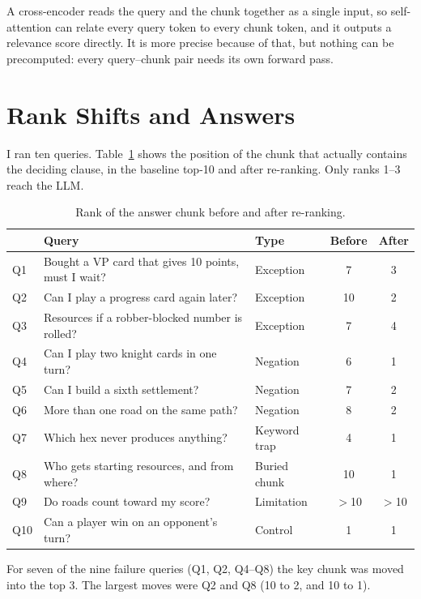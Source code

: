 \documentclass[11pt,a4paper]{article}
\begin{document}
A cross-encoder reads the query and the chunk together as a single input, so self-attention can relate every query token to every chunk token, and it outputs a relevance score directly. It is more precise because of that, but nothing can be precomputed: every query--chunk pair needs its own forward pass.

\section{Rank Shifts and Answers}

I ran ten queries. Table~\ref{tab:ranks} shows the position of the chunk that actually contains the deciding clause, in the baseline top-10 and after re-ranking. Only ranks 1--3 reach the LLM.

\begin{table}[h]
\centering
\small
\begin{tabular}{@{}l p{7cm} l c c@{}}
\toprule
 & Query & Type & Before & After \\
\midrule
Q1 & Bought a VP card that gives 10 points, must I wait? & Exception & 7 & 3 \\
Q2 & Can I play a progress card again later? & Exception & 10 & 2 \\
Q3 & Resources if a robber-blocked number is rolled? & Exception & 7 & 4 \\
Q4 & Can I play two knight cards in one turn? & Negation & 6 & 1 \\
Q5 & Can I build a sixth settlement? & Negation & 7 & 2 \\
Q6 & More than one road on the same path? & Negation & 8 & 2 \\
Q7 & Which hex never produces anything? & Keyword trap & 4 & 1 \\
Q8 & Who gets starting resources, and from where? & Buried chunk & 10 & 1 \\
Q9 & Do roads count toward my score? & Limitation & $>$10 & $>$10 \\
Q10 & Can a player win on an opponent's turn? & Control & 1 & 1 \\
\bottomrule
\end{tabular}
\caption{Rank of the answer chunk before and after re-ranking.}
\label{tab:ranks}
\end{table}

For seven of the nine failure queries (Q1, Q2, Q4--Q8) the key chunk was moved into the top 3. The largest moves were Q2 and Q8 (10 to 2, and 10 to 1).
\end{document}
